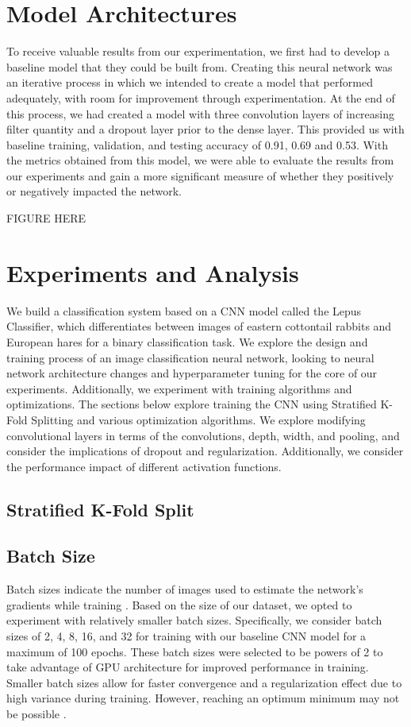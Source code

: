 \documentclass{article}
\begin{document}
\section{Model Architectures}
To receive valuable results from our experimentation, we first had to develop a baseline model that they could be built from. Creating this neural network was an iterative process in which we intended to create a model that performed adequately, with room for improvement through experimentation. At the end of this process, we had created a model with three convolution layers of increasing filter quantity and a dropout layer prior to the dense layer. This provided us with baseline training, validation, and testing accuracy of 0.91, 0.69 and 0.53. With the metrics obtained from this model, we were able to evaluate the results from our experiments and gain a more significant measure of whether they positively or negatively impacted the network.

FIGURE HERE

\section{Experiments and Analysis}
We build a classification system based on a CNN model called the Lepus Classifier, which differentiates between images of eastern cottontail rabbits and European hares for a binary classification task. We explore the design and training process of an image classification neural network, looking to neural network architecture changes and hyperparameter tuning for the core of our experiments. Additionally, we experiment with training algorithms and optimizations. The sections below explore training the CNN using Stratified K-Fold Splitting and various optimization algorithms. We explore modifying convolutional layers in terms of the convolutions, depth, width, and pooling, and consider the implications of dropout and regularization. Additionally, we consider the performance impact of different activation functions.  

\subsection{Stratified K-Fold Split}
\subsection{Batch Size}
Batch sizes indicate the number of images used to estimate the network’s gradients while training \cite{KANDEL2020312}. Based on the size of our dataset, we opted to experiment with relatively smaller batch sizes. Specifically, we consider batch sizes of 2, 4, 8, 16, and 32 for training with our baseline CNN model for a maximum of 100 epochs. These batch sizes were selected to be powers of 2 to take advantage of GPU architecture for improved performance in training. Smaller batch sizes allow for faster convergence and a regularization effect due to high variance during training. However, reaching an optimum minimum may not be possible \cite{KANDEL2020312}. 
\end{document}
